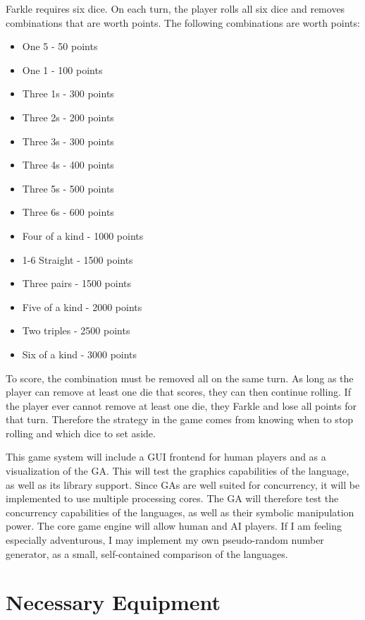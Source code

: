 \documentclass{article}
\begin{document}
Farkle requires six dice.  On each turn, the player rolls all six dice and
removes combinations that are worth points.  The following combinations are
worth points:

\begin{itemize}
\item One 5 - 50 points
\item One 1 - 100 points
\item Three 1s - 300 points
\item Three 2s - 200 points
\item Three 3s - 300 points
\item Three 4s - 400 points
\item Three 5s - 500 points
\item Three 6s - 600 points
\item Four of a kind - 1000 points
\item 1-6 Straight   - 1500 points
\item Three pairs    - 1500 points
\item Five of a kind - 2000 points
\item Two triples    - 2500 points
\item Six of a kind  - 3000 points
\end{itemize}

To score, the combination must be removed all on the same turn.  As long as the
player can remove at least one die that scores, they can then continue rolling.
If the player ever cannot remove at least one die, they Farkle and lose all
points for that turn.  Therefore the strategy in the game comes from knowing
when to stop rolling and which dice to set aside.

This game system will include a GUI frontend for human players and as a
visualization of the GA.  This will test the graphics capabilities of the
language, as well as its library support.  Since GAs are well suited for
concurrency, it will be implemented to use multiple processing cores.  The GA
will therefore test the concurrency capabilities of the languages, as well as
their symbolic manipulation power.  The core game engine will allow human and AI
players.  If I am feeling especially adventurous,  I may implement my own
pseudo-random number generator, as a small, self-contained comparison of the
languages.

\section{Necessary Equipment}
\end{document}
